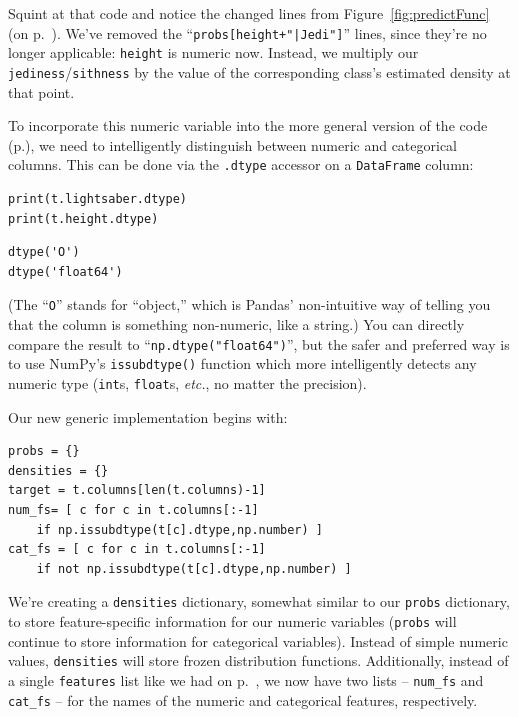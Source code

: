 Squint at that code and notice the changed lines from
Figure~\ref{fig:predictFunc} (on p.~\pageref{fig:predictFunc}). We've removed
the ``\texttt{probs[height+"|Jedi"]}'' lines, since they're no longer
applicable: \texttt{height} is numeric now. Instead, we multiply our
\texttt{jediness}/\texttt{sithness} by the value of the corresponding class's
estimated density at that point.


To incorporate this numeric variable into the more general version of the code
(p.\pageref{codingNbGenerally}), we need to intelligently distinguish between
numeric and categorical columns. This can be done via the \texttt{.dtype}
accessor on a \texttt{DataFrame} column:

\begin{Verbatim}[fontsize=\small,samepage=true,frame=single,framesep=3mm]
print(t.lightsaber.dtype)
print(t.height.dtype)
\end{Verbatim}
\vspace{-.2in}

\begin{Verbatim}[fontsize=\small,samepage=true,frame=leftline,framesep=5mm,framerule=1mm]
dtype('O')
dtype('float64')
\end{Verbatim}


(The ``\texttt{O}'' stands for ``object,'' which is Pandas' non-intuitive way
of telling you that the column is something non-numeric, like a string.) You
can directly compare the result to
``\texttt{np.dtype("float64")}'', but the safer and preferred way is to use
NumPy's \texttt{issubdtype()} function which more intelligently detects any
numeric type (\texttt{int}s, \texttt{float}s, \textit{etc.}, no matter the
precision).

\medskip

Our new generic implementation begins with:

\begin{Verbatim}[fontsize=\small,samepage=true,frame=single,framesep=3mm]
probs = {}
densities = {}
target = t.columns[len(t.columns)-1]
num_fs= [ c for c in t.columns[:-1]
    if np.issubdtype(t[c].dtype,np.number) ]
cat_fs = [ c for c in t.columns[:-1]
    if not np.issubdtype(t[c].dtype,np.number) ]
\end{Verbatim}

We're creating a \texttt{densities} dictionary, somewhat similar to our
\texttt{probs} dictionary, to store feature-specific information for our
numeric variables (\texttt{probs} will continue to store information for
categorical variables). Instead of simple numeric values, \texttt{densities}
will store frozen distribution functions. Additionally, instead of a single
\texttt{features} list like we had on p.~\pageref{codingNbGenerally}, we now
have two lists -- \texttt{num\_fs} and \texttt{cat\_fs} -- for the names of the
numeric and categorical features, respectively.


